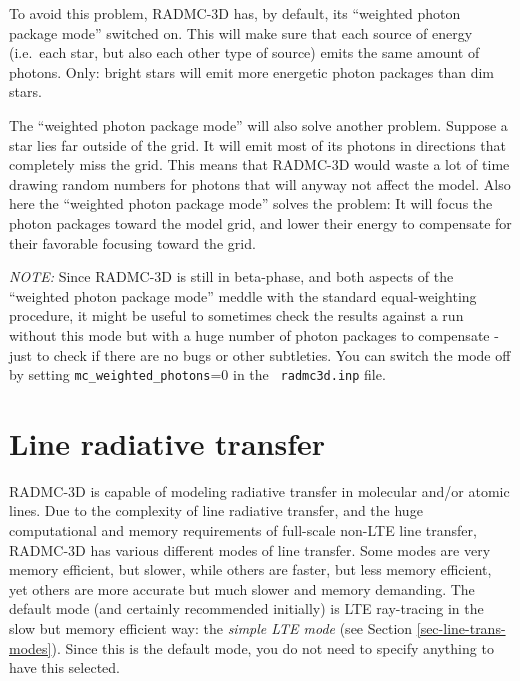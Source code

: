 \documentclass{report}
\begin{document}
To avoid this problem, RADMC-3D has, by default, its ``weighted photon
package mode'' switched on. This will make sure that each source of 
energy (i.e.\ each star, but also each other type of source) emits the
same amount of photons. Only: bright stars will emit more energetic
photon packages than dim stars. 

The ``weighted photon package mode'' will also solve another problem.
Suppose a star lies far outside of the grid. It will emit most of its
photons in directions that completely miss the grid. This means that
RADMC-3D would waste a lot of time drawing random numbers for photons that
will anyway not affect the model. Also here the ``weighted photon package
mode'' solves the problem: It will focus the photon packages toward the
model grid, and lower their energy to compensate for their favorable
focusing toward the grid.

{\em NOTE:} Since RADMC-3D is still in beta-phase, and both aspects of the
``weighted photon package mode'' meddle with the standard equal-weighting
procedure, it might be useful to sometimes check the results against a run
without this mode but with a huge number of photon packages to compensate -
just to check if there are no bugs or other subtleties. You can switch the
mode off by setting {\small\tt mc\_weighted\_photons}=0 in the {\small\tt
  radmc3d.inp} file.


\chapter{Line radiative transfer}
\label{chap-line-transfer}
%
RADMC-3D is capable of modeling radiative transfer in molecular and/or
atomic lines. Due to the complexity of line radiative transfer, and the huge
computational and memory requirements of full-scale non-LTE line transfer,
RADMC-3D has various different modes of line transfer. Some modes are very
memory efficient, but slower, while others are faster, but less memory
efficient, yet others are more accurate but much slower and memory
demanding. The default mode (and certainly recommended initially) is LTE
ray-tracing in the slow but memory efficient way: the {\em simple LTE mode}
(see Section \ref{sec-line-trans-modes}). Since this is the default mode,
you do not need to specify anything to have this selected.
\end{document}
